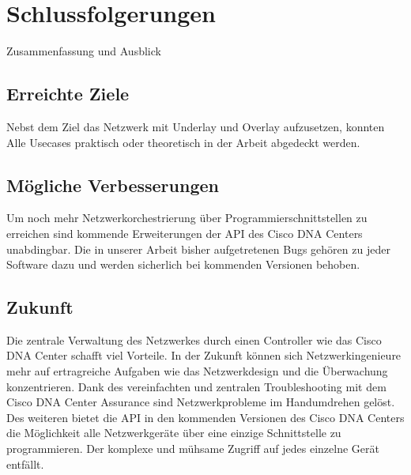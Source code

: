 \section{Schlussfolgerungen}
Zusammenfassung und Ausblick
\subsection{Erreichte Ziele}
Nebst dem Ziel das Netzwerk mit Underlay und Overlay aufzusetzen, konnten Alle Usecases praktisch oder theoretisch in der Arbeit abgedeckt werden. 
\subsection{Mögliche Verbesserungen}
Um noch mehr Netzwerkorchestrierung über Programmierschnittstellen zu erreichen sind kommende Erweiterungen der API des Cisco DNA Centers unabdingbar. Die in unserer Arbeit bisher aufgetretenen Bugs gehören zu jeder Software dazu und werden sicherlich bei kommenden Versionen behoben. 
 
\subsection{Zukunft}
Die zentrale Verwaltung des Netzwerkes durch einen Controller wie das Cisco DNA Center schafft viel Vorteile. In der Zukunft können sich Netzwerkingenieure mehr auf ertragreiche Aufgaben wie das Netzwerkdesign und die Überwachung konzentrieren. Dank des vereinfachten und zentralen Troubleshooting mit dem Cisco DNA Center Assurance sind Netzwerkprobleme im Handumdrehen gelöst. Des weiteren bietet die API in den kommenden Versionen des Cisco DNA Centers die Möglichkeit alle Netzwerkgeräte über eine einzige Schnittstelle zu programmieren. Der komplexe und mühsame Zugriff auf jedes einzelne Gerät entfällt. 